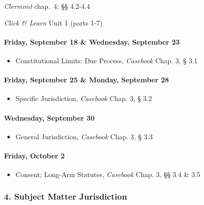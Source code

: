 \documentclass[11pt,letterpaper,twoside]{article}
\providecommand{\tightlist}{%
\setlength{\itemsep}{0em}\setlength{\parskip}{0em}\setlength{\itemindent}{0em}}
\begin{document}
\emph{Clermont} chap.~4: §§ 4.2-4.4

\emph{Click \& Learn} Unit 1 (parts 1-7)

\paragraph{Friday, September 18 \& Wednesday, September
23}\label{friday-september-18-wednesday-september-23}

\begin{itemize}
\tightlist
\item
  Constitutional Limits: Due Process, \emph{Casebook} Chap. 3, § 3.1
\end{itemize}

\paragraph{Friday, September 25 \& Monday, September
28}\label{friday-september-25-monday-september-28}

\begin{itemize}
\tightlist
\item
  Specific Jurisdiction, \emph{Casebook} Chap. 3, § 3.2
\end{itemize}

\paragraph{Wednesday, September 30}\label{wednesday-september-30}

\begin{itemize}
\tightlist
\item
  General Jurisdiction, \emph{Casebook} Chap. 3, § 3.3
\end{itemize}

\paragraph{Friday, October 2}\label{friday-october-2}

\begin{itemize}
\tightlist
\item
  Consent; Long-Arm Statutes, \emph{Casebook} Chap. 3, §§ 3.4 \& 3.5
\end{itemize}

\subsubsection{4. Subject Matter
Jurisdiction}\label{subject-matter-jurisdiction}
\end{document}
